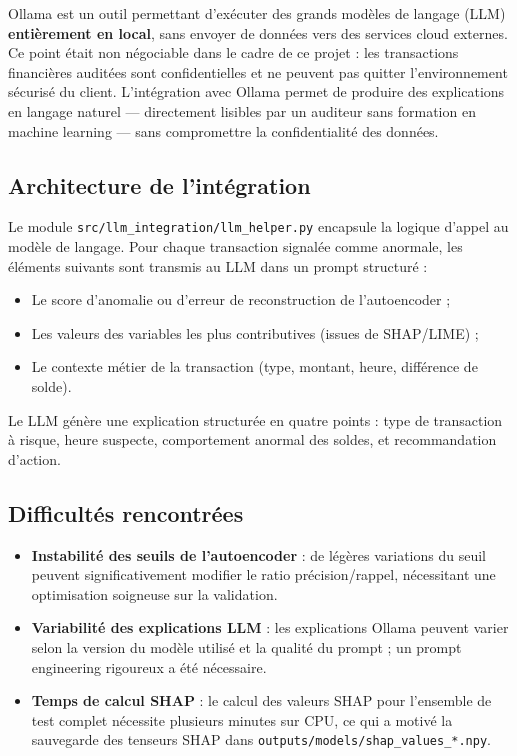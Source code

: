Ollama est un outil permettant d'exécuter des grands modèles de langage (LLM)
\textbf{entièrement en local}, sans envoyer de données vers des services cloud externes.
Ce point était non négociable dans le cadre de ce projet : les transactions financières
auditées sont confidentielles et ne peuvent pas quitter l'environnement sécurisé du client.
L'intégration avec Ollama permet de produire des explications en langage naturel ---
directement lisibles par un auditeur sans formation en machine learning --- sans compromettre
la confidentialité des données.

\subsection{Architecture de l'intégration}

Le module \texttt{src/llm\_integration/llm\_helper.py} encapsule la logique d'appel au
modèle de langage. Pour chaque transaction signalée comme anormale, les éléments suivants
sont transmis au LLM dans un prompt structuré :

\begin{itemize}
  \item Le score d'anomalie ou d'erreur de reconstruction de l'autoencoder ;
  \item Les valeurs des variables les plus contributives (issues de SHAP/LIME) ;
  \item Le contexte métier de la transaction (type, montant, heure, différence de solde).
\end{itemize}

Le LLM génère une explication structurée en quatre points : type de transaction à risque,
heure suspecte, comportement anormal des soldes, et recommandation d'action.

\subsection{Difficultés rencontrées}

\begin{itemize}
  \item \textbf{Instabilité des seuils de l'autoencoder} : de légères variations du seuil
    peuvent significativement modifier le ratio précision/rappel, nécessitant une
    optimisation soigneuse sur la validation.
  \item \textbf{Variabilité des explications LLM} : les explications Ollama peuvent varier
    selon la version du modèle utilisé et la qualité du prompt ; un prompt engineering
    rigoureux a été nécessaire.
  \item \textbf{Temps de calcul SHAP} : le calcul des valeurs SHAP pour l'ensemble de
    test complet nécessite plusieurs minutes sur CPU, ce qui a motivé la sauvegarde des
    tenseurs SHAP dans \texttt{outputs/models/shap\_values\_*.npy}.
\end{itemize}

